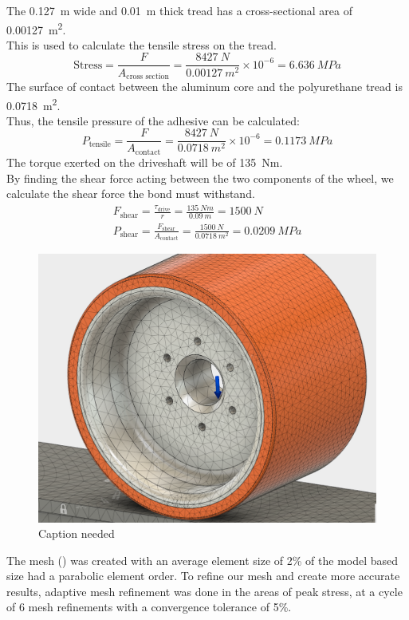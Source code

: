 \documentclass[main.tex]{subfiles}
\begin{document}
    The \SI{0.127}{m} wide and \SI{0.01}{m} thick tread has a cross-sectional area of \SI{0.00127}{m^2}.\\
    This is used to calculate the tensile stress on the tread.
    	\[
  		\textrm{Stress}=\frac{F}{A_{\textrm{cross section}}}=\frac{\SI{8427}{N}}{\SI{0.00127}{m^2}} \times 10^{-6}=\SI{6.636}{MPa}
   		\]
    The surface of contact between the aluminum core and the polyurethane tread is \SI{0.0718}{m^2}.\\
    Thus, the tensile pressure of the adhesive can be calculated:
    	\[
        P_{\textrm{tensile}}=\frac{F}{A_{\textrm{contact}}}=\frac{\SI{8427}{N}}{\SI{0.0718}{m^2}} \times 10^{-6}=\SI{0.1173}{MPa}
        \]
    The torque exerted on the driveshaft will be of \SI{135}{Nm}.\\
    By finding the shear force acting between the two components of the wheel, we calculate the shear force the bond must withstand.
    	\begin{gather*}
        F_{\textrm{shear}}=\frac{\tau_{\textrm{drive}}}{r}=\frac{\SI{135}{Nm}}{\SI{0.09}{m}}=\SI{1500}{N}\\
        P_{\textrm{shear}}=\frac{F_{\textrm{shear}}}{A_{\textrm{contact}}}=\frac{\SI{1500}{N}}{\SI{0.0718}{m^2}}=\SI{0.0209}{MPa}
        \end{gather*}
    \begin{figure}
        \centering
        \includegraphics[width=\linewidth]{images/fig22}
        \caption{Caption needed}
        \label{fig:mesh}
    \end{figure}
    The mesh () was created with an average element size of 2\% of the model based size had a parabolic element order. To refine our mesh and create more accurate results, adaptive mesh refinement was done in the areas of peak stress, at a cycle of 6 mesh refinements with a convergence tolerance of 5\%.
\end{document}
